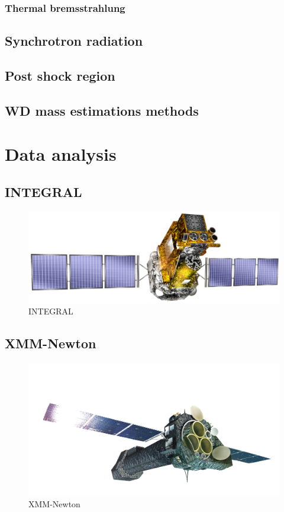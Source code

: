 \documentclass[oneside,a4paper,11pt]{report}
\begin{document}
\subsection{Thermal bremsstrahlung}



\section{Synchrotron radiation}
\section{Post shock region}
\section{WD mass estimations methods}

\chapter{Data analysis}

\section{INTEGRAL}

\begin{figure}[!hbt]
\centering
\includegraphics[totalheight=4cm]{integral}
\caption{INTEGRAL}
\label{microblazar} 
\end{figure}


\section{XMM-Newton}

\begin{figure}[!hbt]
\centering
\includegraphics[totalheight=6cm]{XMM}
\caption{XMM-Newton }
\label{microblazar} 
\end{figure}
\end{document}
